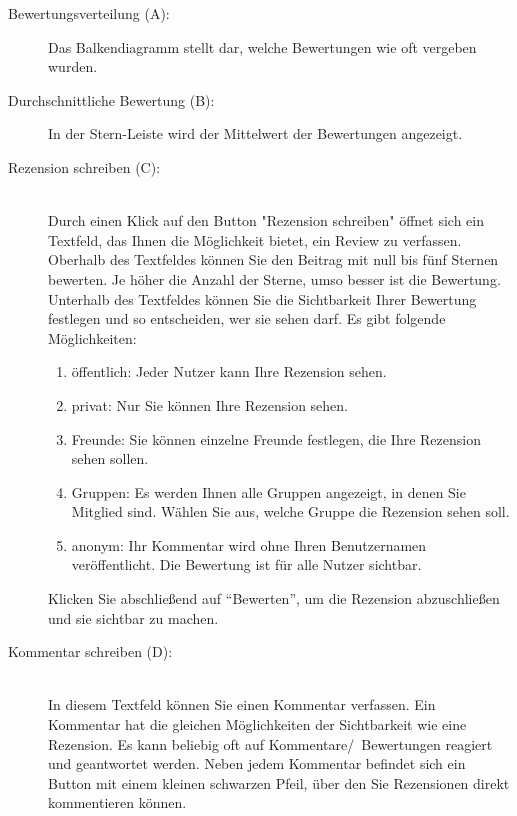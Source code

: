 \begin{enumerate}
\begin{figure}[h!]
 \label{fig:publikationBewerten}
\end{figure}
    \begin{description} 
        \item [Bewertungsverteilung (A):] Das Balkendiagramm stellt dar, welche Bewertungen wie oft vergeben wurden.  %
        \item [Durchschnittliche Bewertung (B):] In der Stern-Leiste wird der Mittelwert der Bewertungen angezeigt.
        \item [Rezension schreiben (C):] \hfill \\
				Durch einen Klick auf den Button "Rezension schreiben" öffnet sich ein Textfeld, das Ihnen die Möglichkeit bietet, ein Review zu verfassen. Oberhalb des Textfeldes können Sie den Beitrag mit null bis fünf Sternen bewerten. Je höher die Anzahl der Sterne, umso besser ist die Bewertung. Unterhalb des Textfeldes können Sie die Sichtbarkeit Ihrer Bewertung festlegen und so entscheiden, wer sie sehen darf. Es gibt folgende Möglichkeiten:
        \begin{enumerate}
            \item öffentlich: Jeder Nutzer kann Ihre Rezension sehen.
            \item privat: Nur Sie können Ihre Rezension sehen.
            \item Freunde: Sie können einzelne Freunde festlegen, die Ihre Rezension sehen sollen.
            \item Gruppen: Es werden Ihnen alle Gruppen angezeigt, in denen Sie Mitglied sind. Wählen Sie aus, welche Gruppe die Rezension sehen soll.
            \item anonym: Ihr Kommentar wird ohne Ihren Benutzernamen veröffentlicht. Die Bewertung ist für alle Nutzer sichtbar.
        \end{enumerate}
       	Klicken Sie abschließend auf \enquote{Bewerten}, um die Rezension abzuschließen und sie sichtbar zu machen.
        \item [Kommentar schreiben (D):] \hfill \\
				In diesem Textfeld können Sie einen Kommentar verfassen. Ein Kommentar hat die gleichen Möglichkeiten der Sichtbarkeit wie eine Rezension.
\newline Es kann beliebig oft auf Kommentare/~Bewertungen reagiert und geantwortet werden. Neben jedem Kommentar befindet sich ein Button mit einem kleinen schwarzen Pfeil, über den Sie Rezensionen direkt kommentieren können. 
    \end{description}
\end{enumerate}